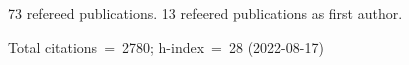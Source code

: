 73 refereed publications. 13 refeered publications as first author.

Total citations~=~2780; h-index~=~28 (2022-08-17)
